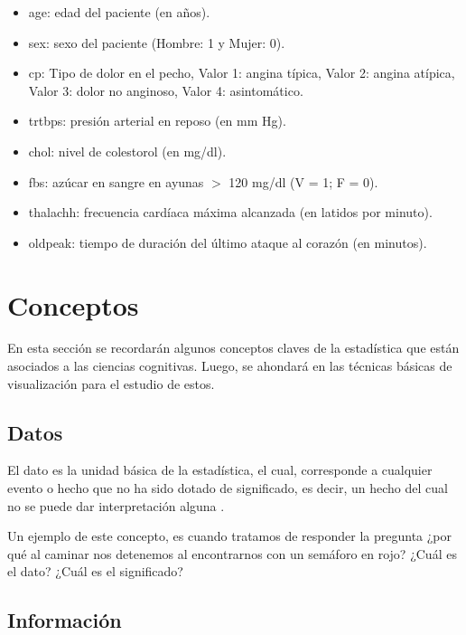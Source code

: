 \documentclass[
  11pt,
]{book}
\providecommand{\tightlist}{%
  \setlength{\itemsep}{0pt}\setlength{\parskip}{0pt}}
\theoremstyle{definition}
\theoremstyle{definition}
\theoremstyle{definition}
\theoremstyle{definition}
\theoremstyle{remark}
\begin{document}
\begin{itemize}
  \begin{itemize}
  \tightlist
  \item
    age: edad del paciente (en años).
  \item
    sex: sexo del paciente (Hombre: 1 y Mujer: 0).
  \item
    cp: Tipo de dolor en el pecho, Valor 1: angina típica, Valor 2: angina atípica, Valor 3: dolor no anginoso, Valor 4: asintomático.
  \item
    trtbps: presión arterial en reposo (en mm Hg).
  \item
    chol: nivel de colestorol (en mg/dl).
  \item
    fbs: azúcar en sangre en ayunas \(>\) 120 mg/dl (V = 1; F = 0).
  \item
    thalachh: frecuencia cardíaca máxima alcanzada (en latidos por minuto).
  \item
    oldpeak: tiempo de duración del último ataque al corazón (en minutos).
  \end{itemize}
\end{itemize}

\section{Conceptos}\label{conceptos}

En esta sección se recordarán algunos conceptos claves de la estadística que están asociados a las ciencias cognitivas. Luego, se ahondará en las técnicas básicas de visualización para el estudio de estos.

\subsection{Datos}\label{datos}

El dato es la unidad básica de la estadística, el cual, corresponde a cualquier evento o hecho que no ha sido dotado de significado, es decir, un hecho del cual no se puede dar interpretación alguna \citep{brachman_knowledge_2004}.

Un ejemplo de este concepto, es cuando tratamos de responder la pregunta ¿por qué al caminar nos detenemos al encontrarnos con un semáforo en rojo? ¿Cuál es el dato? ¿Cuál es el significado?

\subsection{Información}\label{informaciuxf3n}
\end{document}
